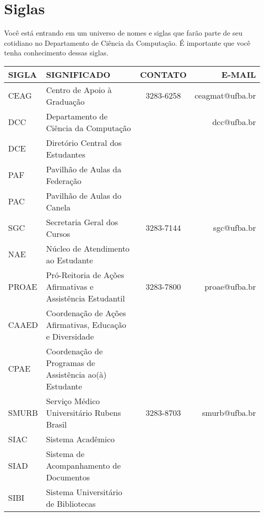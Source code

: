 \chapter{Siglas}

Você está entrando em um universo de nomes e siglas que farão parte de seu cotidiano no Departamento de Ciência da Computação. É importante que você tenha conhecimento dessas siglas.

\begin{table}[h]
\centering
\begin{tabular}{l K{6cm} c r}
\toprule
 SIGLA & SIGNIFICADO & CONTATO & E-MAIL\\
  \midrule
 CEAG & Centro de Apoio à Graduação & 3283-6258 & ceagmat@ufba.br \\
  \midrule
  DCC & Departamento de Ciência da Computação & & dcc@ufba.br \\
  \midrule
  DCE & Diretório Central dos Estudantes & &  \\
  \midrule
  PAF & Pavilhão de Aulas da Federação &  &  \\
  \midrule
  PAC & Pavilhão de Aulas do Canela & & \\
  \midrule
  SGC & Secretaria Geral dos Cursos & 3283-7144 & sgc@ufba.br \\
  \midrule
  NAE & Núcleo de Atendimento ao Estudante & & \\
  \midrule
  PROAE & Pró-Reitoria de Ações Afirmativas e Assistência Estudantil & 3283-7800 & proae@ufba.br \\
  \midrule
  CAAED & Coordenação de Ações Afirmativas, Educação e Diversidade & & \\
  \midrule
  CPAE & Coordenação de Programas de Assistência ao(à) Estudante & & \\
  \midrule
  SMURB & Serviço Médico Universitário Rubens Brasil & 3283-8703 & smurb@ufba.br \\
  \midrule
  SIAC & Sistema Acadêmico & & \\
  \midrule
  SIAD & Sistema de Acompanhamento de Documentos & & \\
  \midrule
  SIBI & Sistema Universitário de Bibliotecas & & \\
 \bottomrule
\end{tabular}
\end{table}

